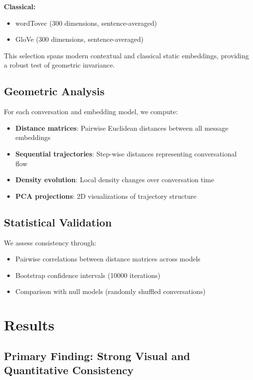 \documentclass[11pt,letterpaper]{article}
\newcommand{\bootstrapIterations}{10000}
\begin{document}
\textbf{Classical:}
\begin{itemize}
\item wordTovec (300 dimensions, sentence-averaged)
\item GloVe (300 dimensions, sentence-averaged)
\end{itemize}

This selection spans modern contextual and classical static embeddings, providing a robust test of geometric invariance.

\subsection{Geometric Analysis}

For each conversation and embedding model, we compute:
\begin{itemize}
\item \textbf{Distance matrices}: Pairwise Euclidean distances between all message embeddings
\item \textbf{Sequential trajectories}: Step-wise distances representing conversational flow
\item \textbf{Density evolution}: Local density changes over conversation time
\item \textbf{PCA projections}: 2D visualizations of trajectory structure
\end{itemize}

\subsection{Statistical Validation}

We assess consistency through:
\begin{itemize}
\item Pairwise correlations between distance matrices across models
\item Bootstrap confidence intervals (\bootstrapIterations{} iterations)
\item Comparison with null models (randomly shuffled conversations)
\end{itemize}

\section{Results}

\subsection{Primary Finding: Strong Visual and Quantitative Consistency}
\end{document}
